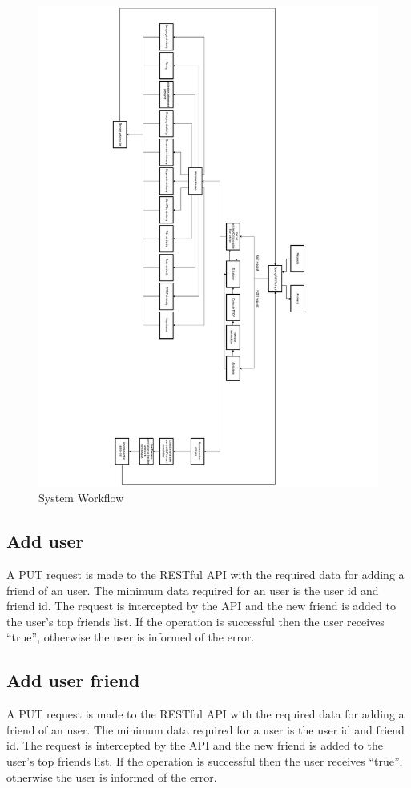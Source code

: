 \begin{figure}
\caption{System Workflow}
\includegraphics[width=\textwidth,height=\textheight,keepaspectratio]{src/img/workflow.pdf}
\end{figure}

\subsection{Add user}
\label{sec:workflow-add-user}
A PUT request is made to the RESTful API with the required data for adding a friend of an user.
The minimum data required for an user is the user id and friend id.
The request is intercepted by the API and the new friend is added to the user’s top friends list. If the operation is successful then the user receives “true”, otherwise the user is informed of the error. 

\subsection{Add user friend}
\label{sec:workflow-add-user-friend}
A PUT request is made to the RESTful API with the required data for adding a friend of an user.
The minimum data required for a user is the user id and friend id.
The request is intercepted by the API and the new friend is added to the user’s top friends list. If the operation is successful then the user receives “true”, otherwise the user is informed of the error. 

